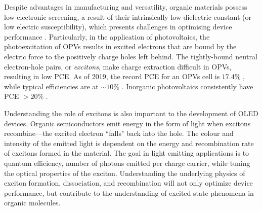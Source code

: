 Despite advantages in manufacturing and versatility, organic materials possess low electronic screening, a result of their intrinsically low dielectric constant (or low electric susceptibility), which presents challenges in optimising device performance \citep{gregg2003comparing}. Particularly, in the application of photovoltaics, the photoexcitation of \acp{OPV} results in excited electrons that are bound by the electric force to the positively charge holes left behind. The tightly-bound neutral electron-hole pairs, or \emph{excitons}, make charge extraction difficult in \acp{OPV}, resulting in low \ac{PCE}. As of 2019, the record \ac{PCE} for an \acp{OPV} cell is $17.4\%$ \citep{Meng2018,Cui2019}, while typical efficiencies are at $\sim 10\%$ \citep{NREL2019champion}. Inorganic photovoltaics consistently have \ac{PCE} $> 20\%$ \citep{NREL2019research}.



Understanding the role of excitons is also important to the development of \ac{OLED} devices. Organic semiconductors emit energy in the form of light when excitons recombine---the excited electron ``falls" back into the hole. The colour and intensity of the emitted light is dependent on the energy and recombination rate of excitons formed in the material. The goal in light emitting applications is to quantum efficiency, number of photons emitted per charge carrier, while tuning the optical properties of the exciton. Understanding the underlying physics of exciton formation, dissociation, and recombination will not only optimize device performance, but contribute to the understanding of excited state phenomena in organic molecules.






